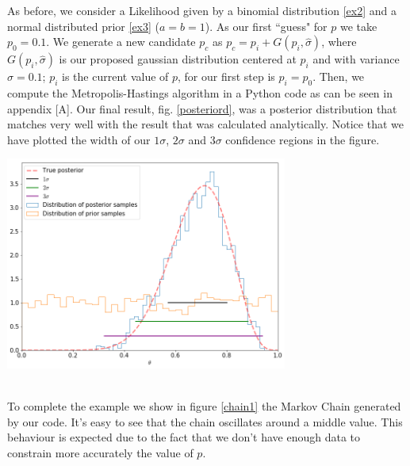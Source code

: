 \documentclass[onecolumn,           %
               showpacs,            %
               preprintnumbers,     %
               aps,                 %
               letterpaper,             %
               superscriptaddress,      %
               nofootinbib,         %
               tightenlines,        %
               floats,floatfix      %
               ,usenatbib,
               ]{revtex4-1}
\begin{document}
As before, we consider a Likelihood given by a binomial distribution \eqref{ex2} and a normal distributed prior \eqref{ex3} ($a=b=1$). As our first ``guess" for $p$ we take $p_0=0.1$. We generate a new candidate $p_c$ as $p_c=p_i+G(p_i,\hat\sigma)$, where $G(p_i,\hat\sigma)$ is our proposed gaussian distribution centered at $p_i$ and with variance $\hat\sigma=0.1$; $p_i$ is the current value of $p$, for our first step is $p_i=p_0$. Then, we compute the Metropolis-Hastings algorithm in a Python code as can be seen in appendix [A]. Our final result,  fig. \ref{posteriord}, was a posterior distribution that matches very well with the result that was calculated analytically. Notice that we have plotted the width of our $1\sigma$, $2\sigma$ and $3\sigma$ confidence regions in the figure. 

\begin{minipage}{\textwidth}
\centering

\includegraphics[height=7cm]{Figures/posterior.png}
\label{posteriord}
\end{minipage}\\

\noindent To complete the example we show in figure \ref{chain1} the Markov Chain generated by our code. It's easy to see that the chain oscillates around a middle value. This behaviour is expected due to the fact that we don't have enough data to constrain more accurately the value of $p$.
\end{document}

